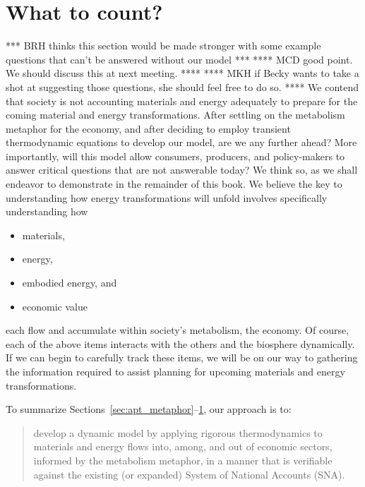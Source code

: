 \section{What to count?}
\label{sec:what_to_count}
*** BRH thinks this section would be made stronger with 
some example questions that can't be answered without our model ***
**** MCD good point. We should discuss this at next meeting. ****
**** MKH if Becky wants to take a shot at suggesting those questions, 
she should feel free to do so. ****
We contend that society is not accounting materials and energy adequately 
to prepare for the coming material and energy transformations.
After settling on the metabolism metaphor for the economy, 
and after deciding to employ transient thermodynamic equations to develop our model, 
are we any further ahead?
More importantly, will this model allow consumers, producers,
and policy-makers to answer critical questions that are not
answerable today? 
We think so, as we shall endeavor to demonstrate in the remainder of this book.
We believe the key to understanding how energy transformations will unfold
involves specifically understanding how

\begin{itemize}
	\item{materials,}
	\item{energy,}
	\item{embodied energy, and}
	\item{economic value}
\end{itemize}

\noindent{}each flow and accumulate within society's metabolism, the economy.
Of course, each of the above items interacts with the others 
and the biosphere dynamically.
If we can begin to carefully track these items, 
we will be on our way to gathering the information required to 
assist planning for upcoming materials and energy transformations.

To summarize Sections~\ref{sec:apt_metaphor}--\ref{sec:what_to_count}, 
our approach is to:

\begin{framed}
	\begin{quote}
	\begin{normalsize}
		develop a dynamic model 
		by applying rigorous thermodynamics 
		to materials and energy flows into, among, 
		and out of economic sectors,
		informed by the metabolism metaphor,
		in a manner that is verifiable against 
		the existing (or expanded) 
		System of National Accounts (SNA).
	\end{normalsize}
	\end{quote}
\end{framed}

